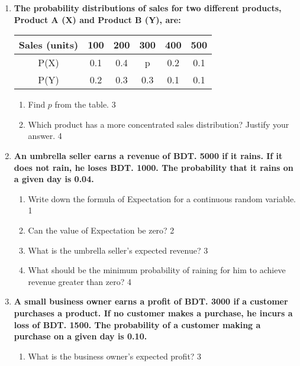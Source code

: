 \documentclass[a4paper,oneside, margin=1.4in]{book}
\begin{document}
\begin{enumerate}
\item
\textbf{The probability distributions of sales for two different products, Product A (X) and Product B (Y), are:} 

\begin{table}[H]
\begin{center}
\begin{tabular}{c|c|c|c|c|c}
Sales (units) & 100  & 200  & 300  & 400  & 500  \\ \hline
P(X)          & 0.1  & 0.4  & p    & 0.2  & 0.1  \\ \hline
P(Y)          & 0.2  & 0.3  & 0.3  & 0.1  & 0.1
\end{tabular}
\end{center}
\end{table}

\begin{enumerate}
    \item
    Find \( p \) from the table. \hfill 3

    \item
    Which product has a more concentrated sales distribution? Justify your answer. \hfill 4
\end{enumerate}

\item
	  \textbf{An umbrella seller earns a revenue of BDT. 5000 if it rains. If it does not rain, he loses BDT. 1000. The probability that it rains on a given day is 0.04.} 
  
  \begin{enumerate}
    \item
	Write down the formula of Expectation for a continuous random variable. \hfill 1
    \item
	Can the value of Expectation be zero? \hfill 2
    \item  
	What is the umbrella seller's expected revenue? \hfill 3
    \item
	What should be the minimum probability of raining for him to achieve revenue greater than zero? \hfill 4
  \end{enumerate}
  
  \item
\textbf{A small business owner earns a profit of BDT. 3000 if a customer purchases a product. If no customer makes a purchase, he incurs a loss of BDT. 1500. The probability of a customer making a purchase on a given day is 0.10.} 

\begin{enumerate}
    \item
    What is the business owner's expected profit? \hfill 3


\end{enumerate}
\end{enumerate}
\end{document}
